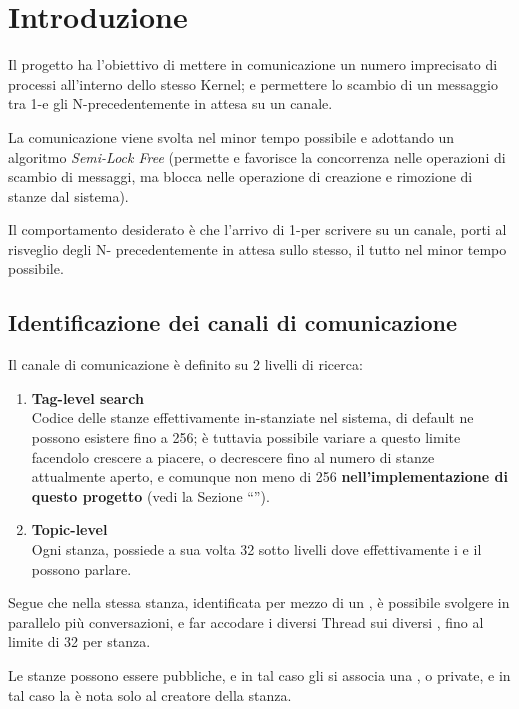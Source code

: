 \section{Introduzione}

Il progetto ha l'obiettivo di mettere in comunicazione un numero imprecisato di processi all'interno dello stesso
Kernel; e permettere lo scambio di un messaggio tra 1-\Writer e gli N-\Reader precedentemente in attesa su un
canale.

La comunicazione viene svolta nel minor tempo possibile e adottando un algoritmo \textit{Semi-Lock Free} (permette e
favorisce la concorrenza nelle operazioni di scambio di messaggi, ma blocca nelle operazione di creazione e rimozione
di stanze dal sistema).

Il comportamento desiderato è che l'arrivo di 1-\Writer per scrivere su un canale, porti al risveglio degli N-\Reader
precedentemente in attesa sullo stesso, il tutto nel minor tempo possibile.

\subsection{Identificazione dei canali di comunicazione}
Il canale di comunicazione è definito su 2 livelli di ricerca:
\begin{enumerate}
    \item \textbf{Tag-level search} \\
    Codice delle stanze effettivamente in-stanziate nel sistema, di default ne possono esistere fino a 256;
    è tuttavia possibile variare a \RunTime questo limite facendolo crescere a piacere, o decrescere fino al
    numero di stanze attualmente aperto, e comunque non meno di 256 \textbf{nell'implementazione di questo progetto}
    (vedi la Sezione ``'').
    \item \textbf{Topic-level} \\
    Ogni stanza, possiede a sua volta 32 sotto livelli dove effettivamente i \Reader e il \Writer  possono parlare.
\end{enumerate}

Segue che nella stessa stanza, identificata per mezzo di un \tagSys, è possibile svolgere in parallelo più
conversazioni, e far accodare i diversi Thread sui diversi \Topic, fino al limite di 32 \Topic per
stanza.

Le stanze possono essere pubbliche, e in tal caso gli si associa una \keySys, o private, e in tal caso la \tagSys è
nota solo al creatore della stanza.


